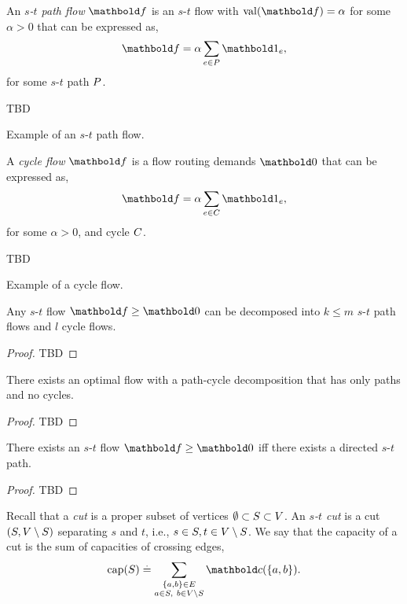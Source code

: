 \begin{defn}
An \emph{$s$-$t$ path flow} $\vf$ is an $s$-$t$ flow with $\val(\vf) = \alpha$ for some $\alpha > 0$ that can be expressed as, \begin{align}
    \vf = \alpha\sum_{e \in \sP} \vOne_e,
\end{align} for some $s$-$t$ path $P$.
\end{defn}
\begin{marginfigure}
TBD
\caption{Example of an $s$-$t$ path flow.}
\end{marginfigure}
\begin{defn}
A \emph{cycle flow} $\vf$ is a flow routing demands $\vZero$ that can be expressed as, \begin{align}
    \vf = \alpha\sum_{e\in\sC} \vOne_e,
\end{align} for some $\alpha > 0$, and cycle $C$.
\end{defn}
\begin{marginfigure}
TBD
\caption{Example of a cycle flow.}
\end{marginfigure}
\begin{lem}
Any $s$-$t$ flow $\vf \geq \vZero$ can be decomposed into $k \leq m$ $s$-$t$ path flows and $l$ cycle flows.
\end{lem}
\begin{proof}
TBD
\end{proof}

\begin{lem}
There exists an optimal flow with a path-cycle decomposition that has only paths and no cycles.
\end{lem}
\begin{proof}
TBD
\end{proof}

\begin{lem}
There exists an $s$-$t$ flow $\vf \geq \vZero$ iff there exists a directed $s$-$t$ path.
\end{lem}
\begin{proof}
TBD
\end{proof}

Recall that a \emph{cut} is a proper subset of vertices $\emptyset \subset S \subset V$. An \emph{$s$-$t$ cut} is a cut $(S, V \setminus S)$ separating $s$ and $t$, i.e., $s \in S, t \in V \setminus S$. We say that the capacity of a cut is the sum of capacities of crossing edges, \begin{align}
    \capa(\sS) \defeq \sum_{\substack{\{a,b\} \in \sE \\ a \in \sS,\ b \in \sV \setminus \sS}} \vc(\{a,b\}).
\end{align}

